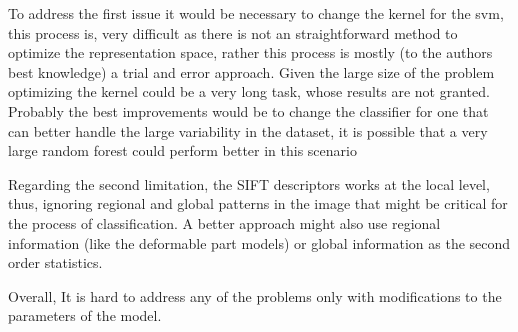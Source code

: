 \documentclass[10pt,twocolumn,letterpaper]{article}
\begin{document}
To address the first issue it would be necessary to change the kernel for the svm, this process is, very difficult as there is not an straightforward method to optimize the representation space, rather this process is mostly (to the authors best knowledge) a trial and error approach. Given the large size of the problem optimizing the kernel  could be a very long task, whose results are not granted. Probably the best improvements would be to change the classifier for one that can better handle the large variability in the dataset, it is possible that a very large random forest could perform better in this scenario

Regarding the second limitation, the SIFT descriptors works at the local level, thus, ignoring regional and global patterns in the image that might be critical for the process of classification. A better approach might also use regional information (like the deformable part models) or global information as the second order statistics.

Overall, It is hard to address any of the problems only with modifications to the parameters of the model.

{\small


}
\end{document}
